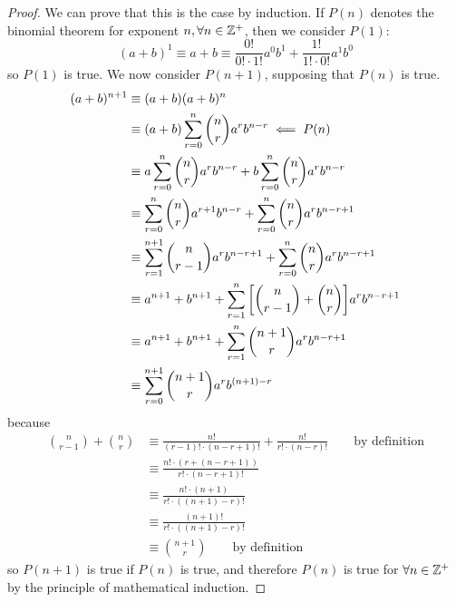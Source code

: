 \begin{proof}
We can prove that this is the case by induction. If \(P(n)\) denotes the
binomial theorem for exponent \(n, \forall n \in \mathbb Z^+\), then we
consider \(P(1)\):
\begin{equation*}
(a + b)^1 \equiv a + b
    \equiv \frac{0!}{0!\cdot 1!} a^0b^1 + \frac{1!}{1!\cdot 0!} a^1b^0
\end{equation*}
so \(P(1)\) is true. We now consider \(P(n + 1)\), supposing that \(P(n)\)
is true.
\begin{align*}
(a + b)^{n + 1} &\equiv (a + b)(a + b)^n \\
    &\equiv (a + b)\sum_{r = 0}^n \binom nr a^r b^{n - r}
        \impliedby P(n) \\
    &\equiv a\sum_{r = 0}^n \binom nr a^r b^{n - r}
          + b\sum_{r = 0}^n \binom nr a^r b^{n - r} \\
    &\equiv \sum_{r = 0}^n \binom nr a^{r + 1} b^{n - r}
          + \sum_{r = 0}^n \binom nr a^r b^{n - r + 1} \\
    &\equiv \sum_{r = 1}^{n + 1} \binom n{r - 1} a^{r} b^{n - r + 1}
          + \sum_{r = 0}^n \binom nr a^r b^{n - r + 1} \\
    &\equiv a^{n + 1} + b^{n + 1}
          + \sum_{r = 1}^n \bqty{\binom n{r - 1} + \binom nr}
            a^r b^{n - r + 1} \\
    &\equiv a^{n + 1} + b^{n + 1}
          + \sum_{r = 1}^n \binom{n + 1}r a^r b^{n - r + 1} \\
    &\equiv \sum_{r = 0}^{n + 1} \binom{n + 1}r a^r b^{(n + 1) - r} \\
\end{align*}
because
\begin{align*}
\binom n{r - 1} + \binom nr &\equiv \frac{n!}{(r - 1)! \cdot (n - r + 1)!}
                                 + \frac{n!}{r! \cdot (n - r)!}
                                    \qquad \text{by definition} \\
    &\equiv \frac{n!\cdot(r + (n - r + 1))}{r! \cdot (n - r + 1)!} \\
    &\equiv \frac{n! \cdot (n + 1)}{r! \cdot ((n + 1) - r)!} \\
    &\equiv \frac{(n + 1)!}{r! \cdot ((n + 1) - r)!} \\
    &\equiv \binom{n + 1} r \qquad \text{by definition}
\end{align*}
so \(P(n + 1)\) is true if \(P(n)\) is true, and therefore \(P(n)\) is true
for \(\forall n \in \mathbb Z^+\) by the principle of mathematical
induction.
\end{proof}

